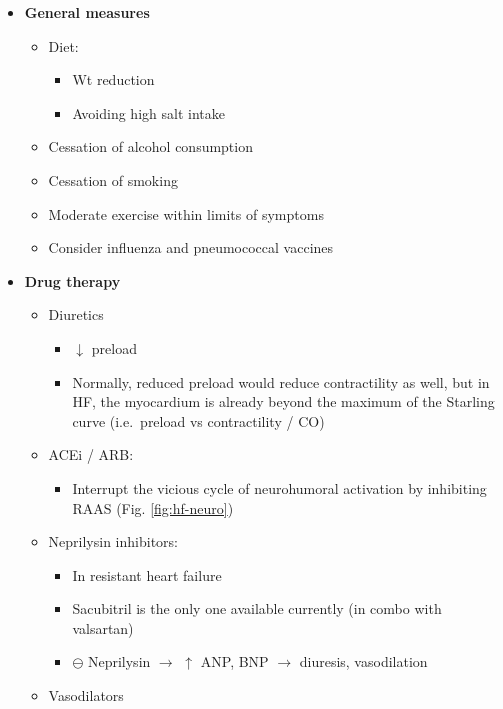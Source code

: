 \documentclass[
  12pt,
]{memoir}
\providecommand{\tightlist}{%
  \setlength{\itemsep}{0pt}\setlength{\parskip}{0pt}}
\begin{document}
\begin{itemize}
\tightlist
\item
  \textbf{General measures}

  \begin{itemize}
  \tightlist
  \item
    Diet:

    \begin{itemize}
    \tightlist
    \item
      Wt reduction
    \item
      Avoiding high salt intake
    \end{itemize}
  \item
    Cessation of alcohol consumption
  \item
    Cessation of smoking
  \item
    Moderate exercise within limits of symptoms
  \item
    Consider influenza and pneumococcal vaccines
  \end{itemize}
\item
  \textbf{Drug therapy}

  \begin{itemize}
  \tightlist
  \item
    Diuretics

    \begin{itemize}
    \tightlist
    \item
      \(\downarrow\) preload
    \item
      Normally, reduced preload would reduce contractility as well, but
      in HF, the myocardium is already beyond the maximum of the
      Starling curve (i.e.~preload vs contractility / CO)
    \end{itemize}
  \item
    ACEi / ARB:

    \begin{itemize}
    \tightlist
    \item
      Interrupt the vicious cycle of neurohumoral activation by
      inhibiting RAAS (Fig. \ref{fig:hf-neuro})
    \end{itemize}
  \item
    Neprilysin inhibitors:

    \begin{itemize}
    \tightlist
    \item
      In resistant heart failure
    \item
      Sacubitril is the only one available currently (in combo with
      valsartan)
    \item
      \(\ominus\) Neprilysin \(\rightarrow\) \(\uparrow\) ANP, BNP
      \(\rightarrow\) diuresis, vasodilation
    \end{itemize}
  \item
    Vasodilators


\end{itemize}
\end{itemize}
\end{document}
